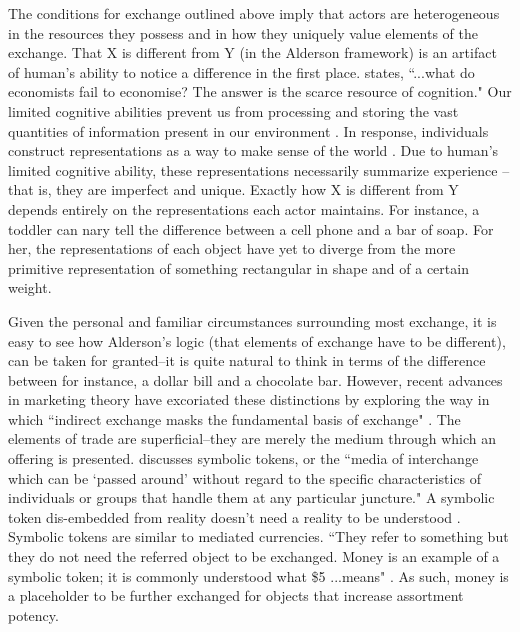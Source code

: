 The conditions for exchange outlined above imply that actors are heterogeneous in the resources they possess and in how they uniquely value elements of the exchange. That X is different from Y (in the Alderson framework) is an artifact of human's ability to notice a difference in the first place. \citet[p. 32]{loasby1999} states, ``...what do economists fail to economise? The answer is the scarce resource of cognition." Our limited cognitive abilities prevent us from processing and storing the vast quantities of information present in our environment \citep{loasby1999, march1958}. In response, individuals construct representations as a way to make sense of the world \citep{denzau1994}. Due to human's limited cognitive ability, these representations necessarily summarize experience \citep{arthur2009, loasby1991, loasby1999, knight1921, whitehead1911, whitehead1951}--that is, they are imperfect and unique. Exactly how X is different from Y depends entirely on the representations each actor maintains. For instance, a toddler can nary tell the difference between a cell phone and a bar of soap. For her, the representations of each object have yet to diverge from the more primitive representation of something rectangular in shape and of a certain weight. 

Given the personal and familiar circumstances surrounding most exchange, it is easy to see how Alderson's logic (that elements of exchange have to be different), can be taken for granted--it is quite natural to think in terms of the difference between for instance, a dollar bill and a chocolate bar. However, recent advances in marketing theory have excoriated these distinctions by exploring the way in which ``indirect exchange masks the fundamental basis of exchange" \citep{vargo2008}. The elements of trade are superficial--they are merely the medium through which an offering is presented. \citet[p. 22]{giddens1991} discusses symbolic tokens, or the ``media of interchange which can be `passed around' without regard to the specific characteristics of individuals or groups that handle them at any particular juncture." A symbolic token dis-embedded from reality doesn't need a reality to be understood \citep{giddens1991, loebler2014}. Symbolic tokens are similar to mediated currencies. ``They refer to something but they do not need the referred object to be exchanged. Money is an example of a symbolic token; it is commonly understood what \$5 ...means" \citep{loebler2014}. As such, money is a placeholder to be further exchanged for objects that increase assortment potency. 

